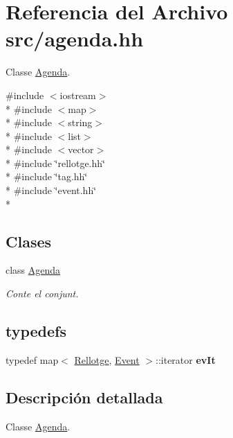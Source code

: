 \hypertarget{agenda_8hh}{}\section{Referencia del Archivo src/agenda.hh}
\label{agenda_8hh}


Classe \hyperlink{class_agenda}{Agenda}.  


{\ttfamily \#include $<$iostream$>$}\\*
{\ttfamily \#include $<$map$>$}\\*
{\ttfamily \#include $<$string$>$}\\*
{\ttfamily \#include $<$list$>$}\\*
{\ttfamily \#include $<$vector$>$}\\*
{\ttfamily \#include \char`\"{}rellotge.\+hh\char`\"{}}\\*
{\ttfamily \#include \char`\"{}tag.\+hh\char`\"{}}\\*
{\ttfamily \#include \char`\"{}event.\+hh\char`\"{}}\\*
\subsection*{Clases}
\begin{DoxyCompactItemize}
\item 
class \hyperlink{class_agenda}{Agenda}
\begin{DoxyCompactList}\small\item\em Conte el conjunt. \end{DoxyCompactList}\end{DoxyCompactItemize}
\subsection*{\textquotesingle{}typedefs\textquotesingle{}}
\begin{DoxyCompactItemize}
\item 
\hypertarget{agenda_8hh_a92fa95d1ca8698cb17d63a303e802338}{}typedef map$<$ \hyperlink{class_rellotge}{Rellotge}, \hyperlink{class_event}{Event} $>$\+::iterator {\bfseries ev\+It}\label{agenda_8hh_a92fa95d1ca8698cb17d63a303e802338}

\end{DoxyCompactItemize}


\subsection{Descripción detallada}
Classe \hyperlink{class_agenda}{Agenda}. 

